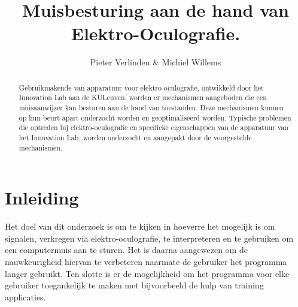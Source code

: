 \documentclass{article}
\title{Muisbesturing aan de hand van Elektro-Oculografie.}
\author{Pieter Verlinden \& Michiel Willems}
\begin{document}
\maketitle

\begin{abstract}
  Gebruikmakende van apparatuur voor elektro-oculografie, ontwikkeld door het Innovation Lab aan de KULeuven, worden er mechanismen aangeboden die een muisaanwijzer kan besturen aan de hand van toestanden. Deze mechanismen kunnen op hun beurt apart onderzocht worden en geoptimaliseerd worden. Typische problemen die optreden bij elektro-oculografie en specifieke eigenschappen van de apparatuur van het Innovation Lab, worden onderzocht en aangepakt door de voorgestelde mechanismen.
\end{abstract}

\section{Inleiding}
Het doel van dit onderzoek is om te kijken in hoeverre het mogelijk is om signalen, verkregen via elektro-oculografie, te interpreteren en te gebruiken om een computermuis aan te sturen. Het is daarna aangewezen om de nauwkeurigheid hiervan te verbeteren naarmate de gebruiker het programma langer gebruikt. Ten slotte is er de mogelijkheid om het programma voor elke gebruiker toegankelijk te maken met bijvoorbeeld de hulp van training applicaties. 
\end{document}

